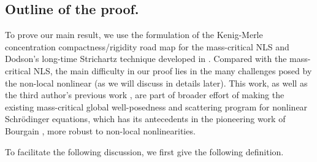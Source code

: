 \documentclass[reqno,11pt]{amsart}
\theoremstyle{plain}
\theoremstyle{definition}
\numberwithin{equation}{section}
\numberwithin{theorem}{section}
\begin{document}
\subsection{Outline of the proof.}
To prove our main result,  we use the formulation of the Kenig-Merle concentration compactness/rigidity road map \cite{KM-Invent} for the mass-critical NLS \cite{TVZ-Forum} and Dodson's long-time Strichartz technique developed in \cite{Dodson-JAMS,Dodson-AJM,Dodson-Duke}. Compared with the mass-critical NLS, the main difficulty in our proof lies in the many challenges posed by the non-local nonlinear (as we will discuss in details later). This work, as well as the third author's previous work \cite{Rosenzweig}, are part of broader effort of making the existing mass-critical global well-posedness and scattering program for nonlinear Schr\"odinger equations, which has its antecedents in the pioneering work of Bourgain \cite{Bourgain}, more robust to non-local nonlinearities.

To facilitate the following discussion, we first give the following  definition.
\end{document}
